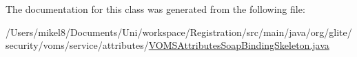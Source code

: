 The documentation for this class was generated from the following file:\begin{DoxyCompactItemize}
\item 
/Users/mikel8/Documents/Uni/workspace/Registration/src/main/java/org/glite/security/voms/service/attributes/\hyperlink{VOMSAttributesSoapBindingSkeleton_8java}{VOMSAttributesSoapBindingSkeleton.java}\end{DoxyCompactItemize}
